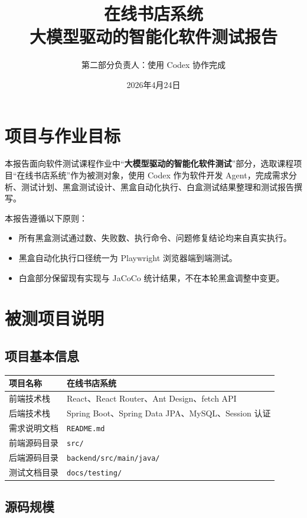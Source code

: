 \documentclass[UTF8,a4paper,12pt]{ctexart}
\title{在线书店系统\\大模型驱动的智能化软件测试报告}
\author{第二部分负责人：使用 Codex 协作完成}
\date{2026年4月24日}
\begin{document}
\maketitle
\tableofcontents
\newpage

\section{项目与作业目标}

本报告面向软件测试课程作业中“\textbf{大模型驱动的智能化软件测试}”部分，选取课程项目“在线书店系统”作为被测对象，使用 Codex 作为软件开发 Agent，完成需求分析、测试计划、黑盒测试设计、黑盒自动化执行、白盒测试结果整理和测试报告撰写。

本报告遵循以下原则：
\begin{itemize}
  \item 所有黑盒测试通过数、失败数、执行命令、问题修复结论均来自真实执行。
  \item 黑盒自动化执行口径统一为 Playwright 浏览器端到端测试。
  \item 白盒部分保留现有实现与 JaCoCo 统计结果，不在本轮黑盒调整中变更。
\end{itemize}

\section{被测项目说明}

\subsection{项目基本信息}

\begin{longtable}{p{4cm}p{10cm}}
\toprule
项目名称 & 在线书店系统 \\
\midrule
前端技术栈 & React、React Router、Ant Design、fetch API \\
后端技术栈 & Spring Boot、Spring Data JPA、MySQL、Session 认证 \\
需求说明文档 & \texttt{README.md} \\
前端源码目录 & \texttt{src/} \\
后端源码目录 & \texttt{backend/src/main/java/} \\
测试文档目录 & \texttt{docs/testing/} \\
\bottomrule
\end{longtable}

\subsection{源码规模}
\end{document}
